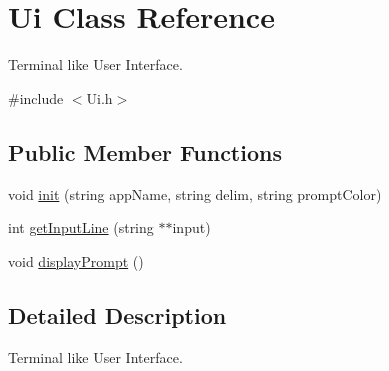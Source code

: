 \hypertarget{classUi}{\section{Ui Class Reference}
\label{classUi}
}


Terminal like User Interface.  




{\ttfamily \#include $<$Ui.\-h$>$}

\subsection*{Public Member Functions}
\begin{DoxyCompactItemize}
\item 
void \hyperlink{classUi_aeac9e09ded7448bd409c6e3764cccf5f}{init} (string app\-Name, string delim, string prompt\-Color)
\item 
int \hyperlink{classUi_a0c7e4cc5c20b22b837a8031290746bdc}{get\-Input\-Line} (string $\ast$$\ast$input)
\item 
void \hyperlink{classUi_a87080dcb48ffe1872681456ae72a20b5}{display\-Prompt} ()
\end{DoxyCompactItemize}


\subsection{Detailed Description}
Terminal like User Interface. 

